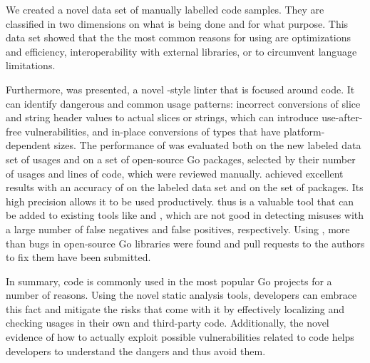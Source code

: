 We created a novel data set of \numberLabeledCodeSnippets{} manually labelled \unsafe{} code samples.
They are classified in two dimensions on what is being done and for what purpose.
This data set showed that the the most common reasons for using \unsafe{} are optimizations and efficiency,
interoperability with external libraries, or to circumvent language limitations.

Furthermore, \toolSafer{} was presented, a novel \toolVet{}-style linter that is focused around \unsafe{} code.
It can identify  dangerous and common usage patterns: incorrect conversions of slice and string header
values to actual slices or strings, which can introduce use-after-free vulnerabilities, and in-place conversions of
types that have platform-dependent sizes.
The performance of \toolSafer{} was evaluated both on the new labeled data set of \unsafe{} usages and on a set of
open-source Go packages, selected by their number of \unsafe{} usages and lines of code, which were reviewed manually.
\toolSafer{} achieved excellent results with an accuracy of \goSaferEvaluationDatasetGosaferAccuracy{} on the labeled
data set and \goSaferEvaluationPackagesGosaferAccuracy{} on the set of packages.
Its high precision allows it to be used productively.
\toolSafer{} thus is a valuable tool that can be added to existing tools like \toolVet{} and \toolGosec{}, which are
not good in detecting \unsafe{} misuses with a large number of false negatives and false positives, respectively.
Using \toolSafer{}, more than \numberBugsFixedRounded{} bugs in open-source Go libraries were found and \numberPRs{}
pull requests to the authors to fix them have been submitted.

In summary, \unsafe{} code is commonly used in the most popular Go projects for a number of reasons.
Using the novel static analysis tools, developers can embrace this fact and mitigate the risks that come with it by
effectively localizing and checking \unsafe{} usages in their own and third-party code.
Additionally, the novel evidence of how to actually exploit possible vulnerabilities related to \unsafe{} code helps
developers to understand the dangers and thus avoid them.
